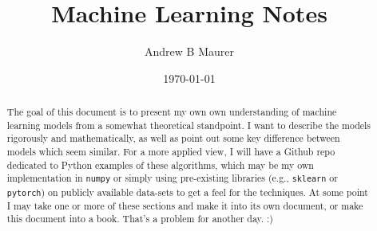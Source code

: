 \documentclass[12pt,draft,reqno]{amsart}
\begin{document}
\title{Machine Learning Notes}
\author{Andrew B Maurer}
\date{\today}

\begin{abstract}
  The goal of this document is to present my own own understanding of machine learning models from a somewhat theoretical standpoint. I want to describe the models rigorously and mathematically, as well as point out some key difference between models which seem similar. For a more applied view, I will have a Github repo dedicated to Python examples of these algorithms, which may be my own implementation in \texttt{numpy} or simply using pre-existing libraries (e.g., \texttt{sklearn} or \texttt{pytorch}) on publicly available data-sets to get a feel for the techniques. At some point I may take one or more of these sections and make it into its own document, or make this document into a book. That's a problem for another day. :)
\end{abstract}

\maketitle

\begin{center}
  \parbox{4.7in}{
    \tableofcontents
    }
\end{center}










\appendix


\end{document}
